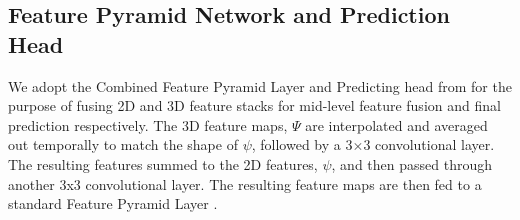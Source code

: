 \documentclass[10pt,twocolumn,letterpaper]{article}
\begin{document}
\begin{table*}[t]
\caption{Results$\%$ in Top-5 mean Average Precision on the validation and test sets of EGO4D v2. In the header of the table, N+V stands for Noun + Verb and N+TTC stands for Noun + Time to Contact. Best results per column within a section of comparable results (horizontal lines) are reported in bold}
\label{table:results}
\vspace{-7pt}
\end{table*}

\begin{table}
\caption{Guided Attention fusion prediction for each output layer of 3D CNN. Results$\%$ in Top-5 mean Average Precision on the validation set of EGO4D v2.}
\label{table:fusion_layer}
\end{table}

\subsection{Feature Pyramid Network and Prediction Head} 
We adopt the Combined Feature Pyramid Layer and Predicting head from \cite{ragusa2023stillfast} for the purpose of fusing 2D and 3D feature stacks for mid-level feature fusion and final prediction respectively. The 3D feature maps, $\Psi$ are interpolated and averaged out temporally to match the shape of $\psi$, followed by a 3$\times$3 convolutional layer. The resulting features summed to the 2D features, $\psi$, and then passed through another 3x3 convolutional layer. The resulting feature maps are then fed to a standard Feature Pyramid Layer \cite{FPN}.  
\end{document}
